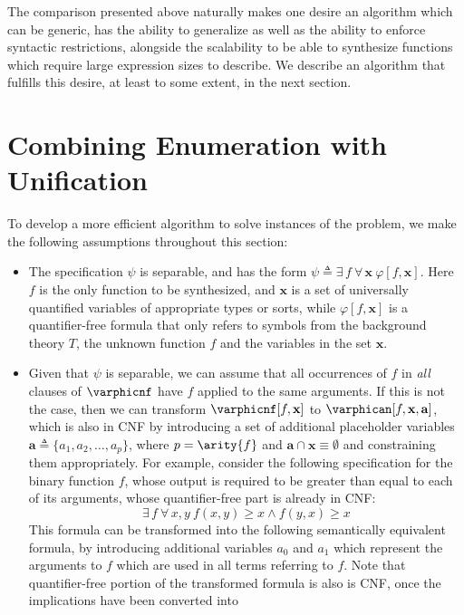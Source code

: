 The comparison presented above naturally makes one desire an algorithm
which can be generic, has the ability to generalize as well as
the ability to enforce syntactic restrictions, alongside the
scalability to be able to synthesize functions which require large
expression sizes to describe. We describe an algorithm that fulfills
this desire, at least to some extent, in the next section.

\section{Combining Enumeration with Unification}
\label{section:eusolver}
To develop a more efficient algorithm to solve instances of the \sygusbody
problem, we make the following assumptions throughout this section:
\begin{itemize}
\item
The \sygusbody specification $\psi$ is separable, and has the
form $\psi \triangleq \exists\,f\ \forall\,\mathbf{x}\ \varphi[f,
\mathbf{x}]$. Here $f$ is the only function to be synthesized, and
$\mathbf{x}$ is a set of universally quantified variables of
appropriate types or sorts, while $\varphi[f, \mathbf{x}]$ is a
quantifier-free formula that only refers to symbols from the
background theory $T$, the unknown function $f$ and the variables in
the set $\mathbf{x}$.
\item
Given that $\psi$ is separable, we can assume that all occurrences of
$f$ in \emph{all} clauses of $\varphicnf$ have $f$ applied to the same
arguments. If this is not the case, then we can
transform $\varphicnf[f, \mathbf{x}]$ to $\varphican[f, \mathbf{x},
\mathbf{a}]$, which is also in CNF by introducing a set of additional
placeholder variables $\mathbf{a} \triangleq \{a_1, a_2, \ldots,
a_p\}$, where $p = \arity{f}$ and $\mathbf{a} \cap \mathbf{x} \equiv
\emptyset$ and constraining them appropriately. For example, consider
the following specification for the binary function $f$, whose output
is required to be greater than equal to each of its arguments, whose
quantifier-free part is already in CNF:
\begin{equation*}
\exists\,f\ \forall\,x, y\ f(x, y) \geq x \wedge f(y, x) \geq x
\end{equation*}
This formula can be transformed into the following semantically
equivalent formula, by introducing additional variables $a_0$ and
$a_1$ which represent the arguments to $f$ which are used in all terms
referring to $f$. Note that quantifier-free portion of the transformed
formula is also is CNF, once the implications have been converted into

\end{itemize}
